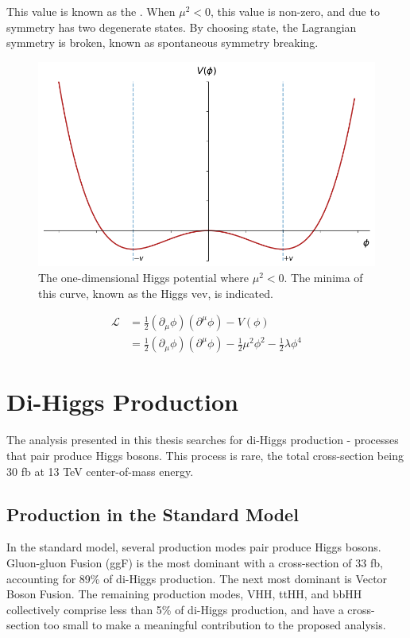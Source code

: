 This value is known as the . When $\mu^2 < 0$, this value is non-zero, and due to symmetry has two degenerate states. By choosing state, the Lagrangian symmetry is broken, known as spontaneous symmetry breaking.

\begin{figure}[!ht]
    \centering
    \includegraphics[width=\textwidth]{chapters/chapter1_theory/images/higgs-2d-vev.png}
    \caption{The one-dimensional Higgs potential where $\mu^2 <0$. The minima of this curve, known as the Higgs \gls{vev}, is indicated.}
    \label{fig:higgs-potential}
\end{figure}


\begin{equation} \label{higgs-lagrangian}
    \begin{aligned}
        \mathcal{L} &= \frac{1}{2}(\partial_{\mu}\phi)(\partial^{\mu}\phi) - V(\phi)\\
        &= \frac{1}{2}(\partial_{\mu}\phi)(\partial^{\mu}\phi) - \frac{1}{2}\mu^2\phi^2 - \frac{1}{2}\lambda\phi^4
    \end{aligned}
\end{equation}



\section{Di-Higgs Production}
The analysis presented in this thesis searches for di-Higgs production - processes that pair produce Higgs bosons. This process is rare, the total cross-section being {\color{red} 30} fb at 13 TeV center-of-mass energy.

\subsection{Production in the Standard Model}
In the standard model, several production modes pair produce Higgs bosons. Gluon-gluon Fusion (ggF) is the most dominant with a cross-section of {\color{red} 33} fb, accounting for {\color{red} 89\%} of di-Higgs production. The next most dominant is Vector Boson Fusion. The remaining production modes, VHH, ttHH, and bbHH collectively comprise less than 5\% of di-Higgs production, and have a cross-section too small to make a meaningful contribution to the proposed analysis.

